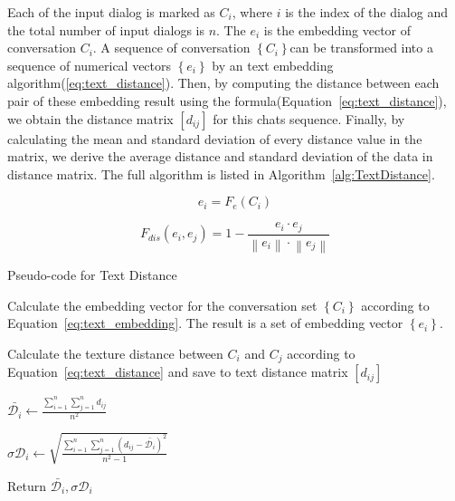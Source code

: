 Each of the input dialog is marked as $ C_i $, where $ i $ is the index of the dialog and the total number of input dialogs is $ n $. The $ e_i $ is the embedding vector of conversation $ C_i $. A sequence of conversation $ \left\{ C_{i} \right\} $can be transformed into a sequence of numerical vectors $ \left\{ e_{i} \right\} $ by an text embedding algorithm(\ref{eq:text_distance}). Then, by computing the distance between each pair of these embedding result using the formula(Equation~\ref{eq:text_distance}), we obtain the distance matrix $ [d_{ij}] $ for this chats sequence. Finally, by calculating the mean and standard deviation of every distance value in the matrix, we derive the average distance and standard deviation of the data in distance matrix. The full algorithm is listed in Algorithm~\ref{alg:TextDistance}.

\begin{equation}
     e_{i} = F_{e}( C_{i} )
    \label{eq:text_embedding}
\end{equation}

\begin{equation}
  F_{dis}(e_i,e_j)=1 -  \frac{e_{i} \cdot e_{j} }{\left\lVert e_{i}\right\rVert  \cdot \left\lVert e_j\right\rVert }
  \label{eq:text_distance}
\end{equation}
    
\begin{algorithm*}[htbp]

    \renewcommand{\arraystretch}{1.3}
    \setlength{\tabcolsep}{10pt}
  
    \caption{Pseudo-code for Text Distance}
  
    \label{alg:TextDistance}
    
    Calculate the embedding vector for the conversation set $ \left\{ C_{i} \right\} $ according to Equation~\ref{eq:text_embedding}. The result is a set of embedding vector $ \left\{ e_{i} \right\} $.
  
     {
         {
            
            Calculate the texture distance between $ C_i $ and $ C_j $ according to Equation~\ref{eq:text_distance} and save to text distance matrix $ [d_{ij}] $
        }
  
    }
 
    $ \bar{\mathcal{D}_{i}}  \leftarrow \frac{\sum_{i=1}^{n}\sum_{j=1}^{n}{d_{ij}}}{ n^2 } $

    $ \sigma \mathcal{D}_{i} \leftarrow \sqrt{\frac{\sum_{i=1}^{n}\sum_{j=1}^{n}{(d_{ij} - \bar{\mathcal{D}_{i}})^2}}{n^2-1}} $
  
    Return $ \bar{\mathcal{D}_{i}} , \sigma \mathcal{D}_{i} $  
  
\end{algorithm*}



